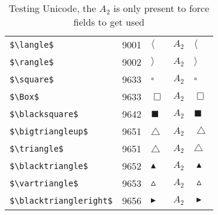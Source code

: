\documentclass{article}
\begin{document}
\begin{table}
\begin{center}
\begin{tabular}{llll}
 \verb#$\langle$#             & 9001    & $\langle$             & $A_2\quad \langle$\\
 \verb#$\rangle$#             & 9002    & $\rangle$             & $A_2\quad \rangle$\\
 \verb#$\square$#             & 9633    & $\square$             & $A_2\quad \square$\\
 \verb#$\Box$#                & 9633    & $\Box$                & $A_2\quad \Box$\\
 \verb#$\blacksquare$#        & 9642    & $\blacksquare$        & $A_2\quad \blacksquare$\\
 \verb#$\bigtriangleup$#      & 9651    & $\bigtriangleup$      & $A_2\quad \bigtriangleup$\\
 \verb#$\triangle$#           & 9651    & $\triangle$           & $A_2\quad \triangle$\\
 \verb#$\blacktriangle$#      & 9652    & $\blacktriangle$      & $A_2\quad \blacktriangle$\\
 \verb#$\vartriangle$#        & 9653    & $\vartriangle$        & $A_2\quad \vartriangle$\\
 \verb#$\blacktriangleright$# & 9656    & $\blacktriangleright$ & $A_2\quad \blacktriangleright$\\
\end{tabular}
\end{center}
\caption{Testing Unicode, the $A_2$ is only present to force fields to get used}
\end{table}
\clearpage
\end{document}
